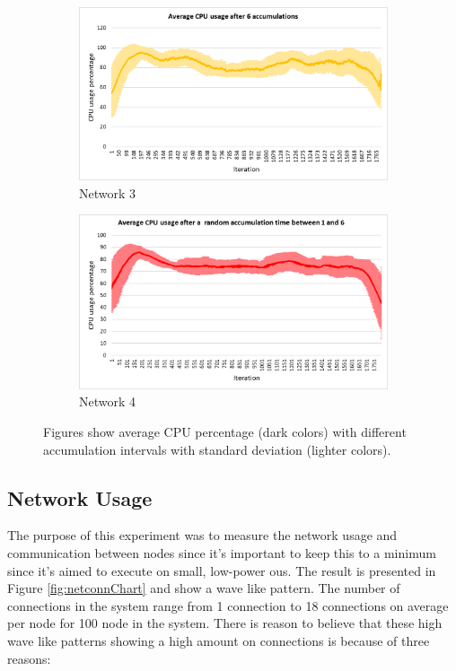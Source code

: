 \documentclass[USenglish]{uit-thesis}
\begin{document}
\begin{figure}
\begin{subfigure}[b]{0.475\textwidth}
            \centering 
            \includegraphics[width=\textwidth]{CPU_stdev_6.png}
            \caption[]%
            {{\small Network 3}}    
            \label{fig:cpufig3}
        \end{subfigure}
        \quad
        \begin{subfigure}[b]{0.475\textwidth}   
            \centering 
            \includegraphics[width=\textwidth]{CPU_stdev_rand.png}
            \caption[]%
            {{\small Network 4}}    
            \label{fig:cpufig4}
        \end{subfigure}
        \caption[Figures show average CPU percentage with different accumulation intervals with standard deviation.]
        {\small Figures show average CPU percentage (dark colors) with different accumulation intervals with standard deviation (lighter colors).} 
        \label{fig:cpuChart}
    \end{figure}



\newpage

\subsection{Network Usage}
The purpose of this experiment was to measure the network usage and communication between nodes since it's important to keep this to a minimum since it's aimed to execute on small, low-power \glspl{ou}. The result is presented in Figure \ref{fig:netconnChart} and show a wave like pattern. The number of connections in the system range from 1 connection to 18 connections on average per node for 100 node in the system.
There is reason to believe that these high wave like patterns showing a high amount on connections is because of three reasons:
\end{document}
